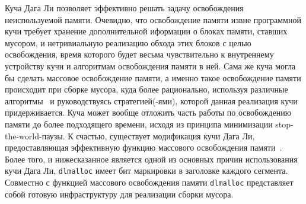 Куча Дага Ли позволяет эффективно решать задачу освобождения неиспользуемой памяти.
Очевидно, что освобождение памяти извне программной кучи требует хранение дополнительной иформации о блоках памяти,
ставших мусором, и нетривиальную реализацию обхода этих блоков с целью освобождения, время которого будет весьма
чувствительно к внутреннему устройству кучи и алгоритмам освобождения памяти в ней.
Сама же куча могла бы сделать массовое освобождение памяти, а именно такое освобождение памяти происходит при сборке мусора,
куда более рационально, используя различные алгоритмы~\cite{GCBook1}
и руководствуясь стратегией(-ями), которой данная реализация кучи придерживается.
Куча может вообще отложить часть работы по освобождению памяти до более подходящего времени,
исходя из принципа минимизации stop-the-world-паузы.
К счастью, существует модификация кучи Дага Ли,
предоставляющая эффективную функцию массового освобождения памяти~\cite{msmalloc}.
Более того, и нижесказанное является одной из основных причин использования кучи Дага Ли,
\lstinline[language= cpp]{dlmalloc} имеет бит маркировки в заголовке каждого сегмента. Совместно с функцией массового освобождения
памяти \lstinline[language= cpp]{dlmalloc} представляет собой готовую инфраструктуру для реализации сборки мусора.

